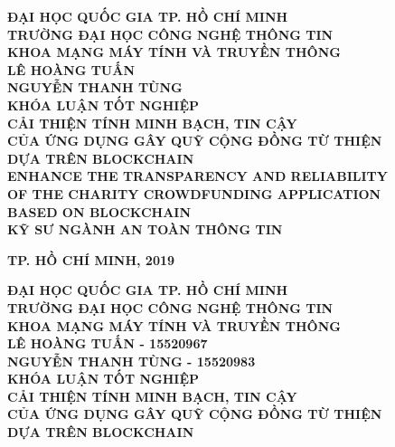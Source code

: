 \documentclass[../main-report.tex]{subfiles}
\begin{document}
\begin{titlepage}
\thispagestyle{empty}
\thisfancypage{
\setlength{\fboxsep}{3pt}
\fbox}{} 
\begin{center}
{\bf\large ĐẠI HỌC QUỐC GIA TP. HỒ CHÍ MINH}\\
{\bf\subtitlesize TRƯỜNG ĐẠI HỌC CÔNG NGHỆ THÔNG TIN}\\
{\bf\subtitlesize KHOA MẠNG MÁY TÍNH VÀ TRUYỀN THÔNG}\\[2.5cm]

{\bf\large LÊ HOÀNG TUẤN}\\
{\bf\large NGUYỄN THANH TÙNG}\\[2.5cm]

{\bf\large KHÓA LUẬN TỐT NGHIỆP}\\[0.5cm]
{\bf\Large CẢI THIỆN TÍNH MINH BẠCH, TIN CẬY}\\
{\bf\Large CỦA ỨNG DỤNG GÂY QUỸ CỘNG ĐỒNG TỪ THIỆN}\\
{\bf\Large DỰA TRÊN BLOCKCHAIN}\\[0.7cm]

{\bf\Large ENHANCE THE TRANSPARENCY AND RELIABILITY}\\
{\bf\Large OF THE CHARITY CROWDFUNDING APPLICATION}\\
{\bf\Large BASED ON BLOCKCHAIN}\\[3cm]
{\bf\large KỸ SƯ NGÀNH AN TOÀN THÔNG TIN}\\[2cm]

\end{center}

\vspace{4cm}
\begin{center}
{\bf TP. HỒ CHÍ MINH, 2019}
\end{center}
\newpage

\thispagestyle{empty}
\thisfancypage{
\setlength{\fboxsep}{3pt}
\fbox}{} 
\begin{center}
{\bf\large ĐẠI HỌC QUỐC GIA TP. HỒ CHÍ MINH}\\
{\bf\subtitlesize TRƯỜNG ĐẠI HỌC CÔNG NGHỆ THÔNG TIN}\\
{\bf\subtitlesize KHOA MẠNG MÁY TÍNH VÀ TRUYỀN THÔNG}\\[3cm]

{\bf\large LÊ HOÀNG TUẤN - 15520967}\\
{\bf\large NGUYỄN THANH TÙNG - 15520983}\\[3cm]

{\bf\large KHÓA LUẬN TỐT NGHIỆP}\\[0.5cm]
{\bf\Large CẢI THIỆN TÍNH MINH BẠCH, TIN CẬY}\\
{\bf\Large CỦA ỨNG DỤNG GÂY QUỸ CỘNG ĐỒNG TỪ THIỆN}\\
{\bf\Large DỰA TRÊN BLOCKCHAIN}\\[0.5cm]


\end{center}
\end{titlepage}
\end{document}
